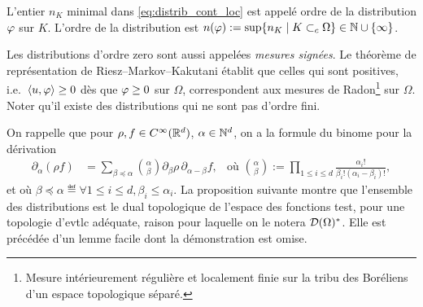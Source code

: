L'entier $n_K$ minimal dans \eqref{eq:distrib_cont_loc} est appelé ordre de la distribution $\varphi$ sur $K$. 
L'ordre de la distribution est $n(\varphi) := \sup \{n_K \mid K \subset_c \Omega\} \in \mathbb{N} \cup \{\infty\}$.

Les distributions d'ordre zero sont aussi appelées \emph{mesures signées}. Le théorème de représentation de Riesz–Markov–Kakutani établit que celles qui sont positives, i.e.\ $\langle u,\varphi\rangle \geq 0$ dès que $\varphi \geq 0$ sur $\Omega$, correspondent aux mesures de Radon\footnote{Mesure intérieurement régulière et localement finie sur la tribu des Boréliens d'un espace topologique séparé.} sur $\Omega$. Noter qu'il existe des distributions qui ne sont pas d'ordre fini. 

On rappelle que pour $\rho,f\in C^\infty(\mathbb{R}^d)$, $\alpha \in \mathbb{N}^d$, on a la formule du binome pour la dérivation
\begin{align}
\label{eq:deriv_binom}
	\partial_\alpha(\rho f) &= \sum_{\beta \preceq \alpha} 
	\binom \alpha \beta \partial_\beta \rho \, \partial_{\alpha-\beta} f,&
	\text{où }
	\binom \alpha \beta := \prod_{1 \leq i \leq d} \frac{\alpha_i!}{\beta_i! (\alpha_i-\beta_i)!},
\end{align}
et où $\beta \preceq \alpha \eqdef \forall 1 \leq i \leq d, \beta_i \leq \alpha_i$.
La proposition suivante montre que l'ensemble des distributions est le dual topologique de l'espace des fonctions test, pour une topologie d'evtlc adéquate, raison pour laquelle on le notera $\mathcal{D}(\Omega)^*$. Elle est précédée d'un lemme facile dont la démonstration est omise. 



%

